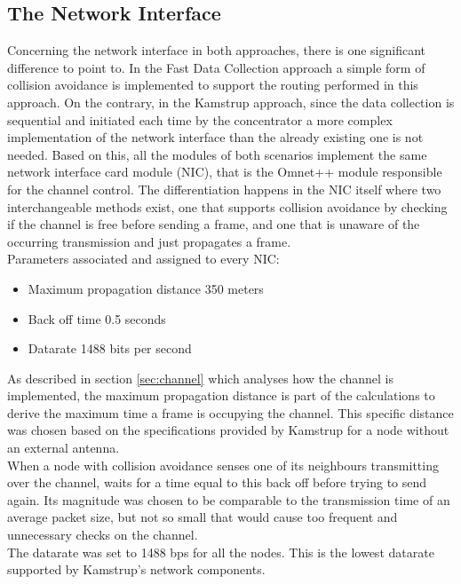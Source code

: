\subsection{The Network Interface}
Concerning the network interface in both approaches, there is one significant difference to point to. In the Fast Data Collection approach a simple form of collision avoidance is implemented to support the routing performed in this approach. On the contrary, in the Kamstrup approach, since the data collection is sequential and initiated each time by the concentrator a more complex implementation of the network interface than the already existing one is not needed. Based on this, all the modules of both scenarios implement the same network interface card module (NIC), that is the Omnet++ module responsible for the channel control. The differentiation happens in the NIC itself where two interchangeable methods exist, one that supports collision avoidance by checking if the channel is free before sending a frame, and one that is unaware of the occurring transmission and just propagates a frame.\\
Parameters associated and assigned to every NIC:

\begin{itemize}
\item Maximum propagation distance 350 meters
\item Back off time 0.5 seconds
\item Datarate 1488 bits per second
\end{itemize}

As described in section \ref{sec:channel} which analyses how the channel is implemented, the maximum propagation distance is part of the calculations to derive the maximum time a frame is occupying the channel. This specific distance was chosen based on the specifications provided by Kamstrup for a node without an external antenna.\\
When a node with collision avoidance senses one of its neighbours transmitting over the channel, waits for a time equal to this back off before trying to send again. Its magnitude was chosen to be comparable to the transmission time of an average packet size, but not so small that would cause too frequent and unnecessary checks on the channel.\\
The datarate was set to 1488 bps for all the nodes. This is the lowest datarate supported by Kamstrup's network components.	

